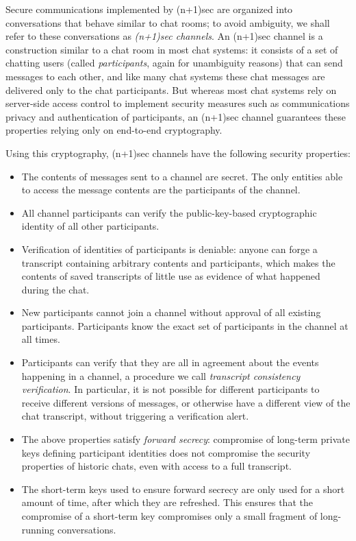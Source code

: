 \documentclass{article}
\begin{document}
Secure communications implemented by (n+1)sec are organized into conversations that behave similar to chat rooms; to avoid ambiguity, we shall refer to these conversations as \emph{(n+1)sec channels}.
An (n+1)sec channel is a construction similar to a chat room in most chat systems: it consists of a set of chatting users (called \emph{participants}, again for unambiguity reasons) that can send messages to each other, and like many chat systems these chat messages are delivered only to the chat participants.
But whereas most chat systems rely on server-side access control to implement security measures such as communications privacy and authentication of participants, an (n+1)sec channel guarantees these properties relying only on end-to-end cryptography.

Using this cryptography, (n+1)sec channels have the following security properties:
\begin{itemize}
\item The contents of messages sent to a channel are secret. The only entities able to access the message contents are the participants of the channel.
\item All channel participants can verify the public-key-based cryptographic identity of all other participants.
\item Verification of identities of participants is deniable: anyone can forge a transcript containing arbitrary contents and participants, which makes the contents of saved transcripts of little use as evidence of what happened during the chat.
\item New participants cannot join a channel without approval of all existing participants. Participants know the exact set of participants in the channel at all times.
\item Participants can verify that they are all in agreement about the events happening in a channel, a procedure we call \emph{transcript consistency verification}. In particular, it is not possible for different participants to receive different versions of messages, or otherwise have a different view of the chat transcript, without triggering a verification alert.
\item The above properties satisfy \emph{forward secrecy}: compromise of long-term private keys defining participant identities does not compromise the security properties of historic chats, even with access to a full transcript.
\item The short-term keys used to ensure forward secrecy are only used for a short amount of time, after which they are refreshed. This ensures that the compromise of a short-term key compromises only a small fragment of long-running conversations.
\end{itemize}
\end{document}
